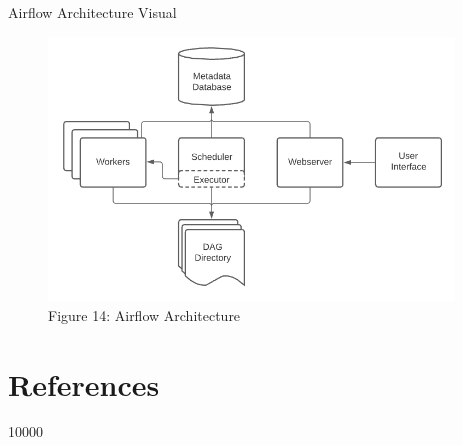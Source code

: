 \documentclass[pdf]{beamer}
\theoremstyle{remark}
\theoremstyle{definition}
\begin{document}
\begin{frame}[t]{Airflow Architecture Visual}
\begin{figure}[htbp]
  \captionsetup{justification=centering}
  \includegraphics[height=7cm, trim=0.0cm 0.0cm 0.0cm 0.0cm width=7cm]{Images/AirFlow_Orchestration.png}
  \caption{Figure {\color{franklinblue} 14}: Airflow Architecture}
\end{figure}
\end{frame}

\section{References}

\begin{frame}[t,allowframebreaks]
 10000
\small


\end{frame}
\end{document}

